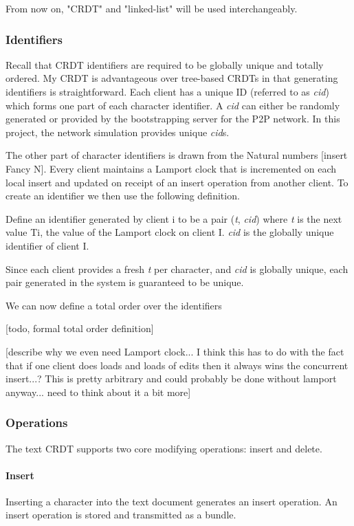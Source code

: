 \documentclass[12pt,a4paper,twoside,openright]{report}
\begin{document}
		From now on, "CRDT" and "linked-list" will be used interchangeably.
	
		\subsubsection{Identifiers}
		
		Recall that CRDT identifiers are required to be globally unique and totally ordered. My CRDT is advantageous over tree-based CRDTs in that generating identifiers is straightforward. Each client has a unique ID (referred to as \textit{cid}) which forms one part of each character identifier. A \textit{cid} can either be randomly generated or provided by the bootstrapping server for the P2P network. In this project, the network simulation provides unique \textit{cid}s.
		
		The other part of character identifiers is drawn from the Natural numbers [insert Fancy N]. Every client maintains a Lamport \cite{lamport1978} clock that is incremented on each local insert and updated on receipt of an insert operation from another client. To create an identifier we then use the following definition.
		
		Define an identifier generated by client i to be a pair (\textit{t}, \textit{cid}) where \textit{t} is the next value Ti, the value of the Lamport clock on client I. \textit{cid} is the globally unique identifier of client I.
		
		Since each client provides a fresh \textit{t} per character, and \textit{cid} is globally unique, each pair generated in the system is guaranteed to be unique.
		
		We can now define a total order over the identifiers
		
		[todo, formal total order definition]
		
		[describe why we even need Lamport clock... I think this has to do with the fact that if one client does loads and loads of edits then it always wins the concurrent insert...? This is pretty arbitrary and could probably be done without lamport anyway... need to think about it a bit more]
		
		
		\subsubsection{Operations}
		The text CRDT supports two core modifying operations: insert and delete.
		
			\paragraph{Insert}
				Inserting a character into the text document generates an insert operation. An insert operation is stored and transmitted as a bundle.
				
\end{document}
